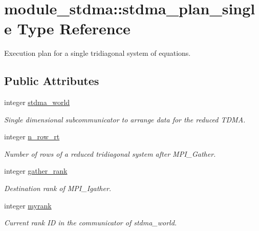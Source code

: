 \hypertarget{structmodule__stdma_1_1stdma__plan__single}{}\section{module\+\_\+stdma\+::stdma\+\_\+plan\+\_\+single Type Reference}
\label{structmodule__stdma_1_1stdma__plan__single}


Execution plan for a single tridiagonal system of equations.  


\subsection*{Public Attributes}
\begin{DoxyCompactItemize}
\item 
integer \mbox{\hyperlink{structmodule__stdma_1_1stdma__plan__single_acb8e449ecd91e246509129edc25216f4}{stdma\+\_\+world}}
\begin{DoxyCompactList}\small\item\em Single dimensional subcommunicator to arrange data for the reduced T\+D\+MA. \end{DoxyCompactList}\item 
integer \mbox{\hyperlink{structmodule__stdma_1_1stdma__plan__single_a1cc9c2f1cb33d4b1a9bae31c194e216c}{n\+\_\+row\+\_\+rt}}
\begin{DoxyCompactList}\small\item\em Number of rows of a reduced tridiagonal system after M\+P\+I\+\_\+\+Gather. \end{DoxyCompactList}\item 
integer \mbox{\hyperlink{structmodule__stdma_1_1stdma__plan__single_a48e694173387e66badd89b9061391c8d}{gather\+\_\+rank}}
\begin{DoxyCompactList}\small\item\em Destination rank of M\+P\+I\+\_\+\+Igather. \end{DoxyCompactList}\item 
integer \mbox{\hyperlink{structmodule__stdma_1_1stdma__plan__single_a072d5f52b3188068307a58d1095097dc}{myrank}}
\begin{DoxyCompactList}\small\item\em Current rank ID in the communicator of stdma\+\_\+world. \end{DoxyCompactList}\end{DoxyCompactItemize}
\textbf{ }\par
